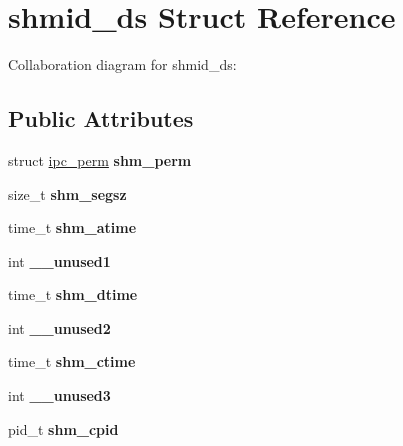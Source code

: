 \hypertarget{structshmid__ds}{}\section{shmid\+\_\+ds Struct Reference}
\label{structshmid__ds}


Collaboration diagram for shmid\+\_\+ds\+:
\subsection*{Public Attributes}
\begin{DoxyCompactItemize}
\item 
\mbox{\label{structshmid__ds_aa211c549a679c1b3eed093b44958a18a}} 
struct \mbox{\hyperlink{structipc__perm}{ipc\+\_\+perm}} {\bfseries shm\+\_\+perm}
\item 
\mbox{\label{structshmid__ds_a0c5defd6c73b4224d9944c770bfa77b9}} 
size\+\_\+t {\bfseries shm\+\_\+segsz}
\item 
\mbox{\label{structshmid__ds_af82fd8f5fdd9d93e3985f5b888382bf8}} 
time\+\_\+t {\bfseries shm\+\_\+atime}
\item 
\mbox{\label{structshmid__ds_a3843bad23d96bc636b3c460eb8fbe44f}} 
int {\bfseries \+\_\+\+\_\+unused1}
\item 
\mbox{\label{structshmid__ds_a27ee9289548d67c2036b695a25dca11b}} 
time\+\_\+t {\bfseries shm\+\_\+dtime}
\item 
\mbox{\label{structshmid__ds_a63cc18ddd72d39b6de225b452f1a2c64}} 
int {\bfseries \+\_\+\+\_\+unused2}
\item 
\mbox{\label{structshmid__ds_a1bee5edd96bfc138b5ca07cb558a10c5}} 
time\+\_\+t {\bfseries shm\+\_\+ctime}
\item 
\mbox{\label{structshmid__ds_a90e88b07d847f595a511ba2739d79d4f}} 
int {\bfseries \+\_\+\+\_\+unused3}
\item 
\mbox{\label{structshmid__ds_afe5c739b33bfa41eb55563571410e52c}} 
pid\+\_\+t {\bfseries shm\+\_\+cpid}

\end{DoxyCompactItemize}
